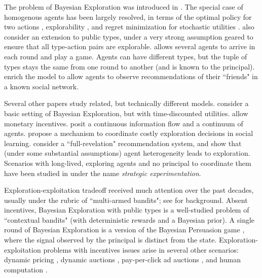 
The problem of Bayesian Exploration was introduced in \cite{Kremer-JPE14}. The special case of homogenous agents has been largely resolved, in terms of the optimal policy for two actions \cite{Kremer-JPE14}, explorability \cite{ICexplorationGames-ec16-working}, and regret minimization for stochastic utilities \cite{ICexploration-ec15}. \cite{ICexploration-ec15} also consider an extension to public types, under a very strong assumption geared to ensure that all type-action pairs are explorable. \cite{ICexplorationGames-ec16-working} allows several agents to arrive in each round and play a game. Agents can have different types, but the tuple of types stays the same from one round to another (and is known to the principal). \cite{Bahar-ec16} enrich the model to allow agents to observe recommendations of their ``friends" in a known social network.

Several other papers study related, but technically different models. \cite{Bimpikis-exploration-ms17} consider a basic setting of Bayesian Exploration, but with time-discounted utilities. \cite{Frazier-ec14} allow monetary incentives. \cite{Che-13} posit a continuous information flow and a continuum of agents. \cite{Bobby-Glen-ec16} propose a mechanism to coordinate costly exploration decisions in social learning. \cite{Sven-aistats18} consider a ``full-revelation" recommendation system, and show that (under some substantial assumptions) agent heterogeneity leads to exploration. Scenarios with long-lived, exploring agents and no principal to coordinate them have been studied in \cite{Bolton-econometrica99,Keller-econometrica05} under the name \emph{strategic experimentation}.

Exploration-exploitation tradeoff received much attention over the past decades, usually under the rubric of ``multi-armed bandits"; see  \cite{Bubeck-survey12,Gittins-book11} for background. Absent incentives, Bayesian Exploration with public types is a well-studied problem of ``contextual bandits" (with deterministic rewards and a Bayesian prior). A single round of Bayesian Exploration is a version of the Bayesian Persuasion game \cite{Kamenica-aer11}, where the signal observed by the principal is distinct from the state. Exploration-exploitation problems with incentives issues arise in several other scenarios: dynamic pricing
    \cite{KleinbergL03,BZ09,BwK-focs13},
dynamic auctions
    \cite{AtheySegal-econometrica13,DynPivot-econometrica10,Kakade-pivot-or13},
pay-per-click ad auctions
    \cite{MechMAB-ec09,DevanurK09,Transform-ec10-jacm},
and human computation
    \cite{RepeatedPA-ec14,Ghosh-itcs13,Krause-www13}.


